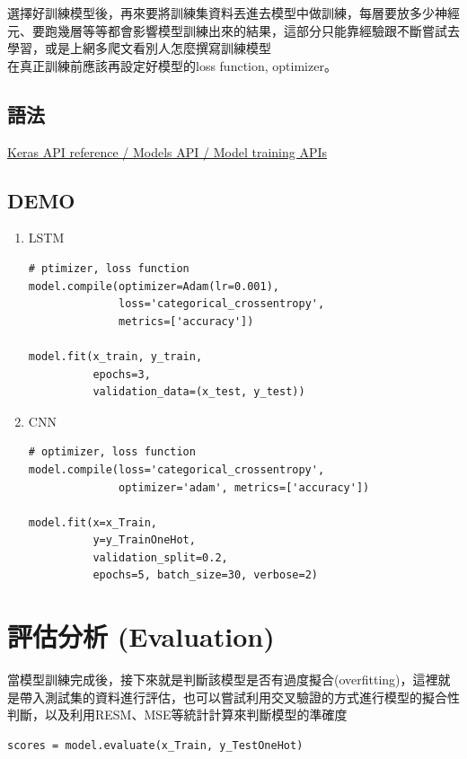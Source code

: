 \documentclass[a4paper,12pt]{article}
\begin{document}
選擇好訓練模型後，再來要將訓練集資料丟進去模型中做訓練，每層要放多少神經元、要跑幾層等等都會影響模型訓練出來的結果，這部分只能靠經驗跟不斷嘗試去學習，或是上網多爬文看別人怎麼撰寫訓練模型\\

在真正訓練前應該再設定好模型的loss function, optimizer。\\
\subsection{語法}
\label{sec:orgd3317ec}
\href{https://keras.io/api/models/model\_training\_apis/}{Keras API reference / Models API / Model training APIs }\\
\subsection{DEMO}
\label{sec:org613ff8a}
\begin{enumerate}
\item LSTM
\label{sec:orge36d9fe}
\lstset{breaklines=true,language=Python,label= ,caption= ,captionpos=b,numbers=none}
\begin{lstlisting}
# ptimizer, loss function
model.compile(optimizer=Adam(lr=0.001),
              loss='categorical_crossentropy',
              metrics=['accuracy'])

model.fit(x_train, y_train,
          epochs=3,
          validation_data=(x_test, y_test))
\end{lstlisting}
\item CNN
\label{sec:org073cf40}
\lstset{breaklines=true,language=Python,label= ,caption= ,captionpos=b,numbers=none}
\begin{lstlisting}
# optimizer, loss function
model.compile(loss='categorical_crossentropy',
              optimizer='adam', metrics=['accuracy'])

model.fit(x=x_Train,
          y=y_TrainOneHot,
          validation_split=0.2,
          epochs=5, batch_size=30, verbose=2)
\end{lstlisting}
\end{enumerate}

\section{評估分析 (Evaluation)}
\label{sec:org3af6549}
當模型訓練完成後，接下來就是判斷該模型是否有過度擬合(overfitting)，這裡就是帶入測試集的資料進行評估，也可以嘗試利用交叉驗證的方式進行模型的擬合性判斷，以及利用RESM、MSE等統計計算來判斷模型的準確度\\
\lstset{breaklines=true,language=Python,label= ,caption= ,captionpos=b,numbers=none}
\begin{lstlisting}
scores = model.evaluate(x_Train, y_TestOneHot)
\end{lstlisting}
\end{document}
